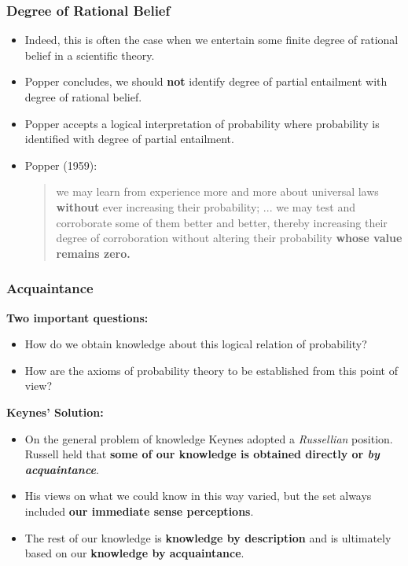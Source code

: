 \documentclass[usenames,dvipsnames, 10pt]{beamer}
\begin{document}
\begin{frame}
	\frametitle{Degree of Rational Belief}
	\begin{itemize}
					\item Indeed, this is
		often the case when we entertain some finite degree of rational belief in a scientific
		theory.
		
		\pause
		
		\item Popper concludes, we should \textbf{not} identify degree of partial entailment with degree of rational belief. 
		
		\pause
		
		\item Popper accepts a logical interpretation of probability
		where probability is identified with degree of partial entailment.
		
		
		\pause
		\item Popper (1959):
		
		\begin{quote}
			we may learn from experience more and more about universal laws \textbf{without}
			ever increasing their probability; ... we may test and corroborate some of
			them better and better, thereby increasing their degree of corroboration
			without altering their probability \textbf{whose value remains zero.}
		\end{quote}
		
	\end{itemize}
\end{frame}


\begin{frame}
	\frametitle{Acquaintance}
	\textbf{Two important questions:}
	\begin{itemize}			
		\item How do we obtain knowledge about this logical relation of probability?
		
		\item How are the axioms of probability theory to be established from this point of view?
	\end{itemize}
	\pause
	\textbf{Keynes' Solution:}	
	\pause
	\begin{itemize}
		\item On the general problem of knowledge Keynes adopted
		a \emph{Russellian} position. Russell held that \textbf{some of our knowledge is obtained directly
		or \emph{by acquaintance}}.
		\pause
		\item His views on what we could know in this way varied, but
		the set always included \textbf{our immediate sense perceptions}.
		\item The rest of our
		knowledge is \textbf{knowledge by description} and is ultimately based on our \textbf{knowledge by acquaintance}.	
	\end{itemize}
\end{frame}
\end{document}
